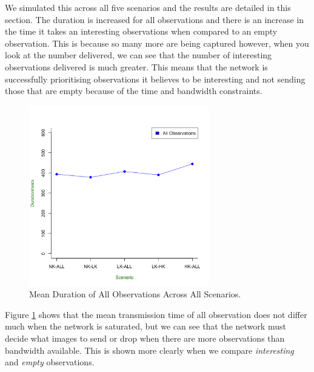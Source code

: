 We simulated this across all five scenarios and the results are detailed in this section. The duration is increased for all observations and there is an increase in the time it takes an interesting observations when compared to an empty observation. This is because so many more are being captured however, when you look at the number delivered, we can see that the number of interesting observations delivered is much greater. This means that the network is successfully prioritising observations it believes to be interesting and not sending those that are empty because of the time and bandwidth constraints.

	\begin{figure}[h]
	\centering
	\includegraphics[width=0.70\textwidth]{Chap7/figures/saturated/total_dur}
	\caption{Mean Duration of All Observations Across All Scenarios.}
	\label{fig:sat:total:dur}
	\end{figure}

Figure \ref{fig:sat:total:dur} shows that the mean transmission time of all observation does not differ much when the network is saturated, but we can see that the network must decide what images to send or drop when there are more observations than bandwidth available. This is shown more clearly when we compare \textit{interesting} and \textit{empty} observations. 

